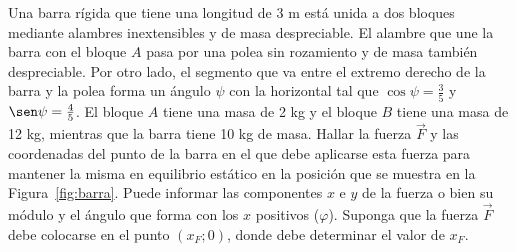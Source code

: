 \documentclass[addpoints]{exam}
\begin{document}
\begin{questions}

    \question \label{ej:equilbrio_CR} Una barra rígida que tiene una longitud de 3 m está unida a dos bloques mediante alambres inextensibles y de masa despreciable. El alambre que une la barra con el bloque $A$ pasa por una polea sin rozamiento y de masa también despreciable. Por otro lado, el segmento que va entre el extremo derecho de la barra y la polea forma un ángulo $\psi$ con la horizontal tal que $\cos \psi = \frac{3}{5}$ y $\sen \psi = \frac{4}{5}$. El bloque $A$ tiene una masa de 2 kg y el bloque $B$ tiene una masa de 12 kg, mientras que la barra tiene 10 kg de masa. Hallar la fuerza $\vec{F}$ y las coordenadas del punto de la barra en el que debe aplicarse esta fuerza para mantener la misma en equilibrio estático en la posición que se muestra en la Figura~\ref{fig:barra}. Puede informar las componentes $x$ e $y$ de la fuerza o bien su módulo y el ángulo que forma con los $x$ positivos ($\varphi$). Suponga que la fuerza $\vec{F}$ debe colocarse en el punto $(x_F; 0)$, donde debe determinar el valor de $x_F$.


\end{questions}
\end{document}
